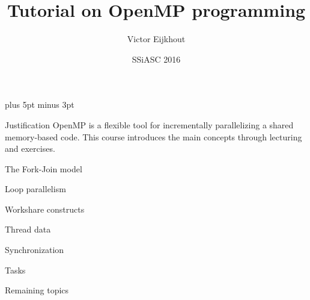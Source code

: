 \documentclass[11pt,headernav]{beamer}
\begin{document}
\parskip=10pt plus 5pt minus 3pt

\title{Tutorial on OpenMP programming}
\author{Victor Eijkhout}
\date{SSiASC 2016}

\begin{frame}
  \titlepage
\end{frame}

\begin{frame}{Justification}
  OpenMP is a flexible tool for incrementally parallelizing a shared
  memory-based code.
  This course introduces the main concepts
  through lecturing and exercises.
\end{frame}

 {The Fork-Join model}


 {Loop parallelism}


 {Workshare constructs}


 {Thread data}


 {Synchronization}


 {Tasks}


 {Remaining topics}

\end{document}
